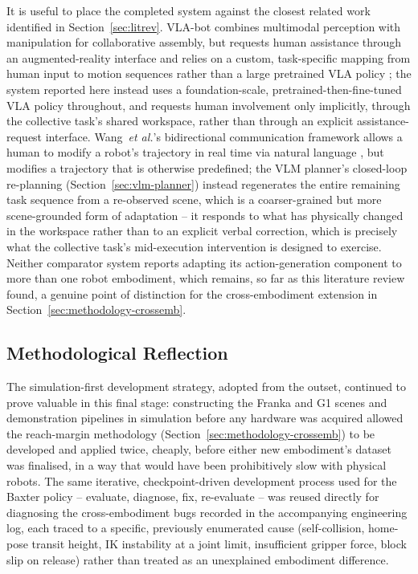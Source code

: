 \documentclass[12pt]{article}
\begin{document}
It is useful to place the completed system against the closest related work identified in Section~\ref{sec:litrev}. VLA-bot combines multimodal perception with manipulation for collaborative assembly, but requests human assistance through an augmented-reality interface and relies on a custom, task-specific mapping from human input to motion sequences rather than a large pretrained VLA policy \cite{WANG2026103268}; the system reported here instead uses a foundation-scale, pretrained-then-fine-tuned VLA policy throughout, and requests human involvement only implicitly, through the collective task's shared workspace, rather than through an explicit assistance-request interface. Wang~\emph{et al.}'s bidirectional communication framework allows a human to modify a robot's trajectory in real time via natural language \cite{wang2026bidirectionalhumanrobotcommunicationphysical}, but modifies a trajectory that is otherwise predefined; the VLM planner's closed-loop re-planning (Section~\ref{sec:vlm-planner}) instead regenerates the entire remaining task sequence from a re-observed scene, which is a coarser-grained but more scene-grounded form of adaptation -- it responds to what has physically changed in the workspace rather than to an explicit verbal correction, which is precisely what the collective task's mid-execution intervention is designed to exercise. Neither comparator system reports adapting its action-generation component to more than one robot embodiment, which remains, so far as this literature review found, a genuine point of distinction for the cross-embodiment extension in Section~\ref{sec:methodology-crossemb}.

\subsection{Methodological Reflection}

The simulation-first development strategy, adopted from the outset, continued to prove valuable in this final stage: constructing the Franka and G1 scenes and demonstration pipelines in simulation before any hardware was acquired allowed the reach-margin methodology (Section~\ref{sec:methodology-crossemb}) to be developed and applied twice, cheaply, before either new embodiment's dataset was finalised, in a way that would have been prohibitively slow with physical robots. The same iterative, checkpoint-driven development process used for the Baxter policy -- evaluate, diagnose, fix, re-evaluate -- was reused directly for diagnosing the cross-embodiment bugs recorded in the accompanying engineering log, each traced to a specific, previously enumerated cause (self-collision, home-pose transit height, IK instability at a joint limit, insufficient gripper force, block slip on release) rather than treated as an unexplained embodiment difference.
\end{document}
